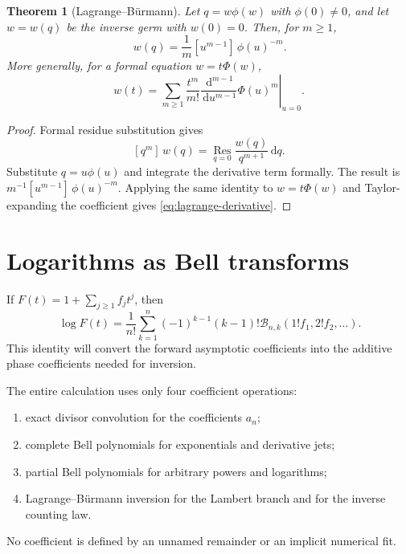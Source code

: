 \documentclass[11pt,a4paper,oneside,openany]{book}
\newtheorem{theorem}{Theorem}[chapter]
\theoremstyle{definition}
\theoremstyle{remark}
\newcommand{\dd}{\,\mathrm d}
\newcommand{\Coeff}[3]{[ #1^{#2}]\,#3}
\newcommand{\Res}{\operatorname*{Res}}
\newcommand{\pBell}[2]{\mathcal B_{#1,#2}}
\begin{document}
\begin{theorem}[Lagrange--B\"urmann]
\label{thm:lagrange}
Let $q=w\phi(w)$ with $\phi(0)\ne0$, and let $w=w(q)$ be the inverse germ with
$w(0)=0$.  Then, for $m\ge1$,
\begin{equation}
 \Coeff qm{w(q)}=\frac1m\Coeff u{m-1}{\phi(u)^{-m}}.
 \label{eq:lagrange-basic}
\end{equation}
More generally, for a formal equation $w=t\Phi(w)$,
\begin{equation}
 w(t)=\sum_{m\ge1}\frac{t^m}{m!}
 \left.\frac{\dd^{m-1}}{\dd u^{m-1}}\Phi(u)^m\right|_{u=0}.
 \label{eq:lagrange-derivative}
\end{equation}
\end{theorem}

\begin{proof}
Formal residue substitution gives
\[
 \Coeff qm{w(q)}=\Res_{q=0}\frac{w(q)}{q^{m+1}}\dd q.
\]
Substitute $q=u\phi(u)$ and integrate the derivative term formally.  The result is
$m^{-1}\Coeff u{m-1}\phi(u)^{-m}$.  Applying the same identity to
$w=t\Phi(w)$ and Taylor-expanding the coefficient gives
\cref{eq:lagrange-derivative}.
\end{proof}

\section{Logarithms as Bell transforms}
If $F(t)=1+\sum_{j\ge1}f_jt^j$, then
\begin{equation}
 \Coeff tn{\log F(t)}
 =\frac1{n!}\sum_{k=1}^n(-1)^{k-1}(k-1)!
   \pBell nk(1!f_1,2!f_2,\ldots).
 \label{eq:log-bell}
\end{equation}
This identity will convert the forward asymptotic coefficients into the additive
phase coefficients needed for inversion.

\begin{masterbox}
The entire calculation uses only four coefficient operations:
\begin{enumerate}
\item exact divisor convolution for the coefficients $a_n$;
\item complete Bell polynomials for exponentials and derivative jets;
\item partial Bell polynomials for arbitrary powers and logarithms;
\item Lagrange--B\"urmann inversion for the Lambert branch and for the inverse
      counting law.
\end{enumerate}
No coefficient is defined by an unnamed remainder or an implicit numerical fit.
\end{masterbox}
\end{document}
